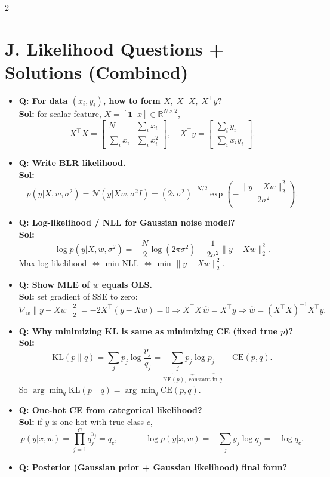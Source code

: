 \documentclass[10pt,fleqn]{article}
\begin{document}
\begin{multicols}{2}
\section*{J. Likelihood Questions + Solutions (Combined)}
\begin{itemize}
  \item \textbf{Q: For data \((x_i,y_i)\), how to form \(X,\;X^\top X,\;X^\top y\)?}\\
  \textbf{Sol:} for scalar feature, \(X=[\mathbf 1\;\;x]\in\mathbb R^{N\times 2}\),
  \[
  X^\top X=\begin{bmatrix}N&\sum_i x_i\\[1pt]\sum_i x_i&\sum_i x_i^2\end{bmatrix},\quad
  X^\top y=\begin{bmatrix}\sum_i y_i\\[1pt]\sum_i x_i y_i\end{bmatrix}.
  \]
  \item \textbf{Q: Write BLR likelihood.}\\
  \textbf{Sol:}
  \[
  p(y|X,w,\sigma^2)=\mathcal N(y|Xw,\sigma^2I)
  =(2\pi\sigma^2)^{-N/2}\exp\!\left(-\frac{\|y-Xw\|_2^2}{2\sigma^2}\right).
  \]
  \item \textbf{Q: Log-likelihood / NLL for Gaussian noise model?}\\
  \textbf{Sol:}
  \[
  \log p(y|X,w,\sigma^2)= -\frac{N}{2}\log(2\pi\sigma^2)-\frac{1}{2\sigma^2}\|y-Xw\|_2^2.
  \]
  Max log-likelihood \(\Leftrightarrow\) min NLL \(\Leftrightarrow\) min \(\|y-Xw\|_2^2\).
  \item \textbf{Q: Show MLE of \(w\) equals OLS.}\\
  \textbf{Sol:} set gradient of SSE to zero:
  \[
  \nabla_w\|y-Xw\|_2^2=-2X^\top(y-Xw)=0
  \Rightarrow X^\top X\,\hat w=X^\top y
  \Rightarrow \hat w=(X^\top X)^{-1}X^\top y.
  \]
  \item \textbf{Q: Why minimizing KL is same as minimizing CE (fixed true \(p\))?}\\
  \textbf{Sol:}
  \[
  \mathrm{KL}(p\|q)=\sum_j p_j\log\frac{p_j}{q_j}
  =\underbrace{\sum_j p_j\log p_j}_{\mathrm{NE}(p),\;\text{constant in }q}
  +\mathrm{CE}(p,q).
  \]
  So \(\arg\min_q\mathrm{KL}(p\|q)=\arg\min_q\mathrm{CE}(p,q)\).
  \item \textbf{Q: One-hot CE from categorical likelihood?}\\
  \textbf{Sol:} if \(y\) is one-hot with true class \(c\),
  \[
  p(y|x,w)=\prod_{j=1}^C q_j^{y_j}=q_c,\qquad
  -\log p(y|x,w)=-\sum_j y_j\log q_j=-\log q_c.
  \]
  \item \textbf{Q: Posterior (Gaussian prior + Gaussian likelihood) final form?}\\

\end{itemize}
\end{multicols}
\end{document}
